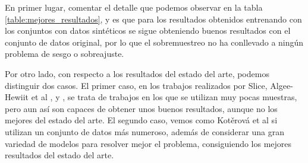 \begin{table}[H]
\centering
{}
\caption{Resultados obtenidos en los trabajos discutidos en el estado del arte.}\label{table:resultados_estado_arte}
\end{table}

En primer lugar, comentar el detalle que podemos observar en la tabla \ref{table:mejores_resultados}, y es que para los resultados obtenidos entrenando con los conjuntos con datos sintéticos se sigue obteniendo buenos resultados con el conjunto de datos original, por lo que el sobremuestreo no ha conllevado a ningún problema de sesgo o sobreajuste.

Por otro lado, con respecto a los resultados del estado del arte, podemos distinguir dos casos. El primer caso, en los trabajos realizados por Slice, Algee-Hewiit et al \cite{modelandoHuesos3D}, \cite{mejoraModelandoHuesos3D} y \cite{segundaMejoraModelandoHuesos3D}, se trata de trabajos en los que se utilizan muy pocas muestras, pero aun así son capaces de obtener unos buenos resultados, aunque no los mejores del estado del arte. El segundo caso, vemos como Kotěrová et al \cite{estimacionHuesosCadera} si utilizan un conjunto de datos más numeroso, además de considerar una gran variedad de modelos para resolver mejor el problema, consiguiendo los mejores resultados del estado del arte.


